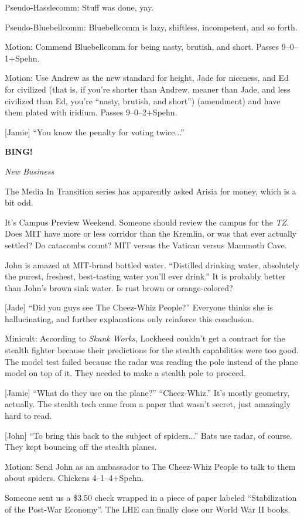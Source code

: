 \documentclass[12pt]{article}
\newcommand{\bing}{{\bf BING!} }
\newcommand{\goto}[1]{\bing \vskip 12pt \centerline{{\em{#1}}}}
\begin{document}
Pseudo-Hasslecomm: Stuff was done, yay.

Pseudo-Bluebellcomm: Bluebellcomm is lazy, shiftless, incompetent,
and so forth.

Motion: Commend Bluebellcomm for being nasty, brutish, and short.
Passes 9--0--1+Spehn.

Motion: Use Andrew as the new standard for height, Jade for niceness,
and Ed for civilized (that is, if you're shorter than Andrew, meaner
than Jade, and less civilized than Ed, you're ``nasty, brutish, and
short'') (amendment) and have them plated with iridium.  Passes
9--0--2+Spehn.

[Jamie] ``You know the penalty for voting twice...''

\goto{New Business}

The Media In Transition series has apparently asked Arisia for money,
which is a bit odd.

It's Campus Preview Weekend.  Someone should review the campus for
the {\em TZ}.  Does MIT have more or less corridor than the Kremlin,
or was that ever actually settled?  Do catacombs count?  MIT versus
the Vatican versus Mammoth Cave.

John is amazed at MIT-brand bottled water.  ``Distilled drinking water,
absolutely the purest, freshest, best-tasting water you'll ever drink.''
It is probably better than John's brown sink water.  Is rust brown or
orange-colored?

[Jade] ``Did you guys see The Cheez-Whiz People?''  Everyone thinks
she is hallucinating, and further explanations only reinforce this
conclusion.

Minicult: According to {\em Skunk Works}, Lockheed couldn't get a
contract for the stealth fighter because their predictions for the
stealth capabilities were too good.  The model test failed because
the radar was reading the pole instead of the plane model on top
of it.  They needed to make a stealth pole to proceed.

[Jamie] ``What do they use on the plane?''  ``Cheez-Whiz.''  It's
mostly geometry, actually.  The stealth tech came from a paper that
wasn't secret, just amazingly hard to read.

[John] ``To bring this back to the subject of spiders...''  Bats
use radar, of course.  They kept bouncing off the stealth planes.

Motion: Send John as an ambassador to The Cheez-Whiz People to talk
to them about spiders.  Chickens 4--1--4+Spehn.

Someone sent us a \$3.50 check wrapped in a piece of paper labeled
``Stabilization of the Post-War Economy''.  The LHE can finally close
our World War II books.
\end{document}
